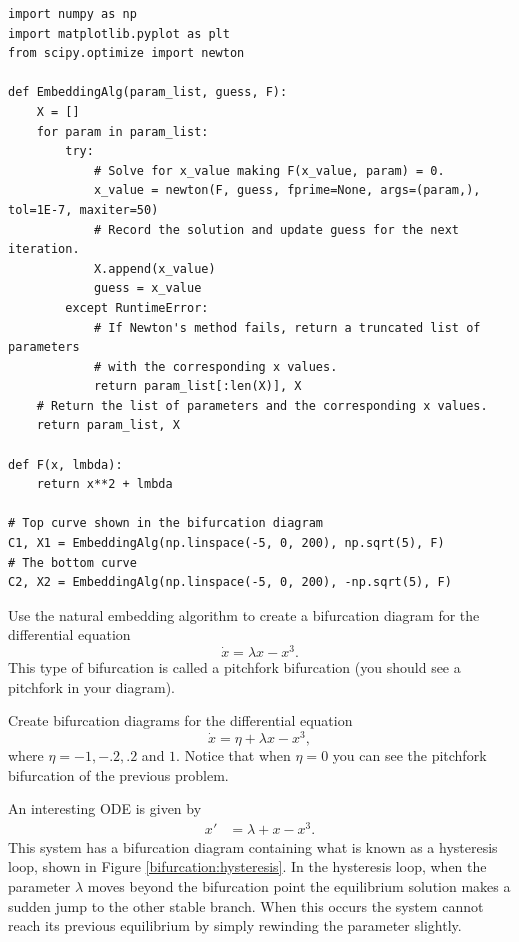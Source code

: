 \begin{lstlisting}
import numpy as np
import matplotlib.pyplot as plt
from scipy.optimize import newton

def EmbeddingAlg(param_list, guess, F):
    X = []
    for param in param_list:
        try:
            # Solve for x_value making F(x_value, param) = 0.
            x_value = newton(F, guess, fprime=None, args=(param,), tol=1E-7, maxiter=50)
            # Record the solution and update guess for the next iteration.
            X.append(x_value)
            guess = x_value
        except RuntimeError:
            # If Newton's method fails, return a truncated list of parameters
            # with the corresponding x values.
            return param_list[:len(X)], X
    # Return the list of parameters and the corresponding x values.
    return param_list, X

def F(x, lmbda):
    return x**2 + lmbda

# Top curve shown in the bifurcation diagram
C1, X1 = EmbeddingAlg(np.linspace(-5, 0, 200), np.sqrt(5), F)
# The bottom curve
C2, X2 = EmbeddingAlg(np.linspace(-5, 0, 200), -np.sqrt(5), F)
\end{lstlisting}

\begin{problem}
Use the natural embedding algorithm to create a bifurcation diagram for the differential equation
\[\dot{x} = \lambda x-x^3.\]
This type of bifurcation is called a pitchfork bifurcation (you should see a pitchfork in your diagram).
\end{problem}

\begin{problem}
Create bifurcation diagrams for the differential equation
\[\dot{x} = \eta + \lambda x-x^3,\]
where $\eta = -1, -.2, .2$ and $1.$  Notice that when $\eta = 0$ you can see the pitchfork bifurcation of the previous problem.
\end{problem}

An interesting ODE is given by 
\begin{align*}
	x' &= \lambda + x - x^3.
\end{align*}
This system has a bifurcation diagram containing what is known as a hysteresis loop, shown in Figure \ref{bifurcation:hysteresis}.
In the hysteresis loop, when the parameter $\lambda$ moves beyond the bifurcation point the equilibrium solution makes a sudden jump to the other stable branch.
When this occurs the system cannot reach its previous equilibrium by simply rewinding the parameter slightly. 

